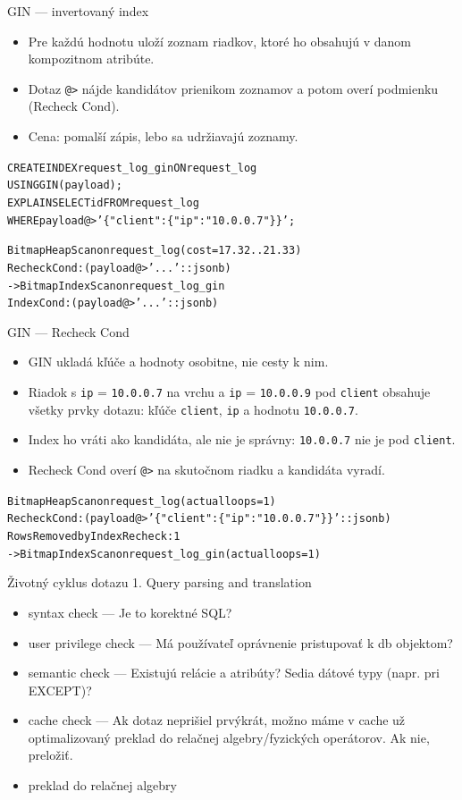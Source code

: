 \documentclass[12pt]{beamer}
\begin{document}
\begin{frame}[fragile]{GIN --- invertovaný index}
\begin{itemize}
\item Pre každú hodnotu uloží zoznam riadkov, ktoré ho obsahujú v danom kompozitnom atribúte.
\item Dotaz \verb|@>| nájde kandidátov prienikom zoznamov a potom overí podmienku (\alert{Recheck Cond}).
\item Cena: pomalší zápis, lebo sa udržiavajú zoznamy.
\end{itemize}
{\footnotesize
\begin{alltt}
CREATE INDEX request_log_gin ON request_log
  USING \alert{GIN} (payload);
EXPLAIN SELECT id FROM request_log
WHERE payload @> '\{"client": \{"ip": "10.0.0.7"\}\}';

\alert{Bitmap Heap Scan} on request_log  (cost=17.32..21.33)
  \alert{Recheck Cond}: (payload @> '...'::jsonb)
  ->  \alert{Bitmap Index Scan} on request_log_gin
        Index Cond: (payload @> '...'::jsonb)
\end{alltt}
}
\end{frame}

\begin{frame}[fragile]{GIN --- Recheck Cond}
\begin{itemize}
\item GIN ukladá kľúče a hodnoty osobitne, nie cesty k nim.
\item Riadok s \verb|ip| = \verb|10.0.0.7| na vrchu a \verb|ip| = \verb|10.0.0.9| pod \verb|client| obsahuje všetky prvky dotazu: kľúče \verb|client|, \verb|ip| a hodnotu \verb|10.0.0.7|.
\item Index ho vráti ako kandidáta, ale nie je správny: \verb|10.0.0.7| nie je pod \verb|client|.
\item \alert{Recheck Cond} overí \verb|@>| na skutočnom riadku a kandidáta vyradí.
\end{itemize}
{\scriptsize
\begin{alltt}
Bitmap Heap Scan on request_log (actual loops=1)
  Recheck Cond: (payload @> '\{"client": \{"ip": "10.0.0.7"\}\}'::jsonb)
  \alert{Rows Removed by Index Recheck: 1}
  ->  Bitmap Index Scan on request_log_gin (actual loops=1)
\end{alltt}
}
\end{frame}


\begin{frame}[fragile]{Životný cyklus dotazu}
1. Query parsing and translation
\begin{itemize}
  \item syntax check --- Je to korektné SQL?
  \item user privilege check --- Má používateľ oprávnenie pristupovať k db objektom?
  \item semantic check --- Existujú relácie a atribúty? Sedia dátové typy (napr. pri EXCEPT)?
  \item cache check --- Ak dotaz neprišiel prvýkrát,
      možno máme v cache už optimalizovaný preklad do relačnej algebry/fyzických operátorov. Ak nie, preložiť.
  \item preklad do relačnej algebry
\end{itemize}
\end{frame}
\end{document}
